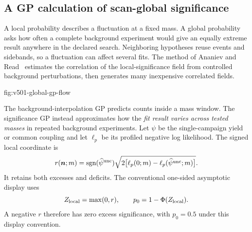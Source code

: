 \subsection{A GP calculation of scan-global significance}
\label{v5-sec:global-method}\label{sec:v5-global}

A local probability describes a fluctuation at a fixed mass. A global
probability asks how often a complete background experiment would give
an equally extreme result anywhere in the declared search. Neighboring
hypotheses reuse events and sidebands, so a fluctuation can affect several
fits. The method of Ananiev and Read~\cite{AnanievRead2023} estimates the
correlation of the local-significance field from controlled background
perturbations, then generates many inexpensive correlated fields.

{fig:v501-global-gp-flow}

The background-interpolation GP predicts counts inside a mass window.
The significance GP instead approximates how the \emph{fit result varies
across tested masses} in repeated background experiments. Let $\psi$ be the
single-campaign yield or common coupling and let $\ell_p$ be its profiled
negative log likelihood. The signed local coordinate is
\begin{equation}
 r(\bm n;m)=\operatorname{sgn}(\widehat\psi^{\rm unc})
 \sqrt{2\bigl[\ell_p(0;m)-\ell_p(\widehat\psi^{\rm unc};m)\bigr]}.
 \label{v5-eq:signed-local-mapping}
\end{equation}
It retains both excesses and deficits. The conventional one-sided
asymptotic display uses
\begin{equation}
 Z_{\rm local}=\max(0,r),\qquad p_0=1-\Phi(Z_{\rm local}).
\end{equation}
A negative $r$ therefore has zero excess significance, with $p_0=0.5$
under this display convention.

